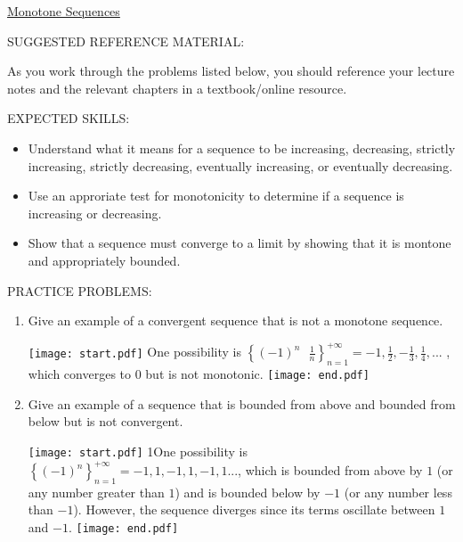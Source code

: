 \documentclass[12pt]{article}
\begin{document}
\begin{center}
\underline{\LARGE{Monotone Sequences}}
\end{center}

\noindent SUGGESTED REFERENCE MATERIAL:

\medskip

\noindent As you work through the problems listed below, you should reference your lecture notes and the relevant chapters in a textbook/online resource.

\medskip

\noindent EXPECTED SKILLS:

\medskip

\begin{itemize}[topsep=0pt]

\item Understand what it means for a sequence to be increasing, decreasing, strictly increasing, strictly decreasing, eventually increasing, or eventually decreasing. 

\item Use an approriate test for monotonicity to determine if a sequence is increasing or decreasing.

\item Show that a sequence must converge to a limit by showing that it is montone and appropriately bounded.

\end{itemize}

\bigskip

\noindent PRACTICE PROBLEMS:

\begin{enumerate}

\item Give an example of a convergent sequence that is not a monotone sequence. 

\texttt{[image: start.pdf]}
{{One possibility is $\left\{ (-1)^n \text{ } \frac{1}{n} \right\}_{n = 1}^{+\infty}=-1, \frac{1}{2}, -\frac{1}{3}, \frac{1}{4}, ... $ , which converges to $0$ but is not monotonic.}}
\texttt{[image: end.pdf]}


\item Give an example of a sequence that is bounded from above and bounded from below but is not convergent.

\texttt{[image: start.pdf]}
{{{1\linewidth}{One possibility is $\left\{ (-1)^n \right\}_{n = 1}^{+\infty}=-1, 1, -1, 1, -1, 1 ... $, which is bounded from above by $1$ (or any number greater than $1$) and is bounded below by $-1$
(or any number less than $-1$).  However, the sequence diverges since its terms oscillate between $1$ and $-1$.}}}
\texttt{[image: end.pdf]}



\end{enumerate}
\end{document}
